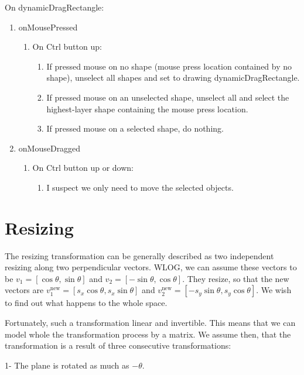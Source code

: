 \documentclass{report}
\begin{document}
\newpage

On dynamicDragRectangle:

\begin{enumerate}
\item
onMousePressed
\begin{enumerate}
\item
On Ctrl button up:
\begin{enumerate}
\item
If pressed mouse on no shape (mouse press location contained by no shape), unselect all shapes and set to drawing dynamicDragRectangle.
\item
If pressed mouse on an unselected shape, unselect all and select the highest-layer shape containing the mouse press location.
\item
If pressed mouse on a selected shape, do nothing.
\end{enumerate}
\end{enumerate}
\item
onMouseDragged
\begin{enumerate}
\item
On Ctrl button up or down:
\begin{enumerate}
\item
I suspect we only need to move the selected objects.
\end{enumerate}
\end{enumerate}
\end{enumerate}





\section{Resizing}


The resizing transformation can be generally described as two independent resizing along two perpendicular vectors. WLOG, we can assume these vectors to be $v_1=[\cos \theta,\sin \theta]$ and $v_2=[-\sin \theta,\cos \theta]$. They resize, so that the new vectors are $v_1^\text{new}=[s_x\cos \theta,s_x\sin \theta]$ and $v_2^\text{new}=[-s_y\sin \theta,s_y\cos \theta]$. We wish to find out what happens to the whole space.

Fortunately, such a transformation linear and invertible. This means that we can model whole the transformation process by a matrix. We assume then, that the transformation is a result of three consecutive transformations:

1- The plane is rotated as much as $-\theta$.
\end{document}
